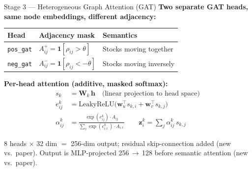 \documentclass[aspectratio=169, 10pt]{beamer}
\newcommand{\myvec}[1]{\mathbf{#1}}
\begin{document}
\begin{frame}[shrink=8]{Stage 3 — Heterogeneous Graph Attention (GAT)}
  \textbf{Two separate GAT heads, same node embeddings, different adjacency:}

  \vspace{0.15cm}
  \begin{center}
  \renewcommand{\arraystretch}{1.3}
  \begin{tabular}{lll}
    \toprule
    \textbf{Head} & \textbf{Adjacency mask} & \textbf{Semantics} \\
    \midrule
    \texttt{pos\_gat} & $A^+_{ij} = \mathbf{1}[\rho_{ij} > \theta]$
                      & \textcolor{positive}{Stocks moving together} \\
    \texttt{neg\_gat} & $A^-_{ij} = \mathbf{1}[\rho_{ij} < -\theta]$
                      & \textcolor{negative}{Stocks moving inversely} \\
    \bottomrule
  \end{tabular}
  \end{center}

  \vspace{0.1cm}
  \textbf{Per-head attention (additive, masked softmax):}
  \begin{align*}
    s_k &= \myvec{W}_k\,\myvec{h}
          \quad\text{(linear projection to head space)}\\[2pt]
    e_{ij}^k &= \text{LeakyReLU}\!\bigl(\myvec{w}_u^\top s_{k,i}
                + \myvec{w}_v^\top s_{k,j}\bigr)\\[2pt]
    \alpha_{ij}^k &= \frac{\exp(e_{ij}^k)\cdot A_{ij}}
                         {\sum_{\ell}\exp(e_{i\ell}^k)\cdot A_{i\ell}}
    \qquad
    \myvec{z}_i^k = \sum_j \alpha_{ij}^k\, s_{k,j}
  \end{align*}

  8 heads $\times$ 32 dim $=$ 256-dim output; residual skip-connection added
  \textcolor{negative}{\footnotesize(new vs.\ paper)}.
  Output is MLP-projected 256\,$\to$\,128 before semantic attention
  \textcolor{negative}{\footnotesize(new vs.\ paper)}.
\end{frame}
\end{document}
